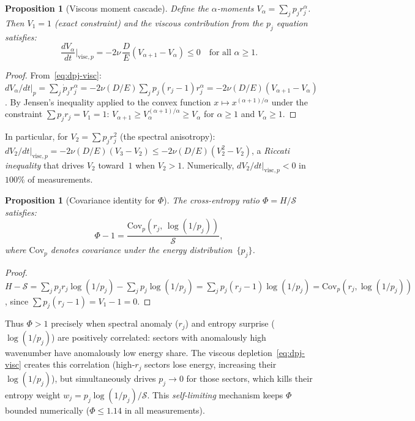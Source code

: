 \documentclass[11pt]{article}
\newtheorem{proposition}[theorem]{Proposition}
\theoremstyle{definition}
\newcommand{\cS}{\mathcal{S}}
\begin{document}
\begin{proposition}[Viscous moment cascade]
\label{prop:moment-cascade}
Define the $\alpha$-moments $V_\alpha = \sum_j p_j r_j^\alpha$.
Then $V_1 = 1$ (exact constraint) and the viscous
contribution from the $p_j$ equation satisfies:
\begin{equation}\label{eq:moment-cascade}
\frac{dV_\alpha}{dt}\bigg|_{\mathrm{visc},p}
= -2\nu\,\frac{D}{E}(V_{\alpha+1} - V_\alpha)
\leq 0 \quad\text{for all } \alpha \geq 1.
\end{equation}
\end{proposition}

\begin{proof}
From~\eqref{eq:dpj-visc}:
$dV_\alpha/dt|_p = \sum_j \dot{p}_j r_j^\alpha
= -2\nu(D/E)\sum_j p_j(r_j - 1)r_j^\alpha
= -2\nu(D/E)(V_{\alpha+1} - V_\alpha)$.
By Jensen's inequality applied to the convex function
$x \mapsto x^{(\alpha+1)/\alpha}$ under the constraint
$\sum p_j r_j = V_1 = 1$:
$V_{\alpha+1} \geq V_\alpha^{(\alpha+1)/\alpha}
\geq V_\alpha$ for $\alpha \geq 1$ and $V_\alpha \geq 1$.
\end{proof}

In particular, for $V_2 = \sum p_j r_j^2$
(the spectral anisotropy):
$dV_2/dt|_{\mathrm{visc},p} = -2\nu(D/E)(V_3 - V_2)
\leq -2\nu(D/E)(V_2^2 - V_2)$,
a \emph{Riccati inequality} that drives $V_2$ toward~$1$
when $V_2 > 1$.  Numerically, $dV_2/dt|_{\mathrm{visc},p}
< 0$ in $100\%$ of measurements.

\begin{proposition}[Covariance identity for $\Phi$]
\label{prop:covariance}
The cross-entropy ratio $\Phi = H/\cS$ satisfies:
\begin{equation}\label{eq:Phi-cov}
\Phi - 1 = \frac{\mathrm{Cov}_p(r_j,\,
\log(1/p_j))}{\cS},
\end{equation}
where $\mathrm{Cov}_p$ denotes covariance under the
energy distribution~$\{p_j\}$.
\end{proposition}

\begin{proof}
$H - \cS = \sum_j p_j r_j\log(1/p_j)
- \sum_j p_j\log(1/p_j)
= \sum_j p_j(r_j - 1)\log(1/p_j)
= \mathrm{Cov}_p(r_j,\log(1/p_j))$,
since $\sum p_j(r_j - 1) = V_1 - 1 = 0$.
\end{proof}

Thus $\Phi > 1$ precisely when spectral anomaly ($r_j$)
and entropy surprise ($\log(1/p_j)$) are positively
correlated: sectors with anomalously high wavenumber
have anomalously low energy share.  The viscous
depletion~\eqref{eq:dpj-visc} creates this correlation
(high-$r_j$ sectors lose energy, increasing their
$\log(1/p_j)$), but simultaneously drives $p_j \to 0$
for those sectors, which kills their entropy weight
$w_j = p_j\log(1/p_j)/\cS$.  This \emph{self-limiting}
mechanism keeps $\Phi$ bounded numerically
($\Phi \leq 1.14$ in all measurements).
\end{document}
